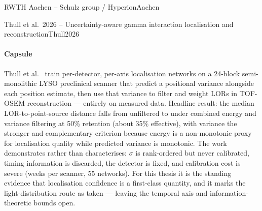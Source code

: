 \begin{programnote}{RWTH Aachen -- Schulz group / Hyperion}{Aachen}
\begin{papernote}{Thull et al.\ 2026 -- Uncertainty-aware gamma interaction localisation and reconstruction}{Thull2026}
\paragraph{Capsule}
Thull et al.\ \cite{Thull2026} train per-detector, per-axis localisation networks on a
24-block semi-monolithic LYSO preclinical scanner that predict a positional variance
alongside each position estimate, then use that variance to filter and weight LORs in
TOF-OSEM reconstruction --- entirely on measured data. Headline result: the median
LOR-to-point-source distance falls from  unfiltered to  under combined
energy and variance filtering at 50\% retention (about 35\% effective), with variance the stronger and
complementary criterion because energy is a non-monotonic proxy for localisation quality
while predicted variance is monotonic. The work demonstrates rather than characterises:
$\sigma$ is rank-ordered but never calibrated, timing information is discarded, the
detector is fixed, and calibration cost is severe (weeks per scanner, 55 networks).
For this thesis it is the standing evidence that localisation confidence is a
first-class quantity, and it marks the light-distribution route as taken --- leaving the
temporal axis and information-theoretic bounds open.


\end{papernote}
\end{programnote}
